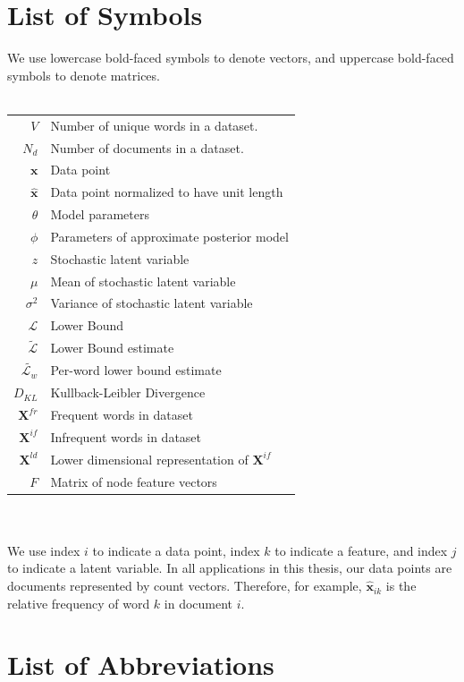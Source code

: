 \documentclass{report}
\begin{document}
\section*{List of Symbols}
We use lowercase bold-faced symbols to denote vectors, and uppercase bold-faced symbols to denote matrices. \\ \\
\begin{tabular}{r l}
	\hspace{15mm} 
	$V$ & Number of unique words in a dataset. \\
	$N_d$ & Number of documents in a dataset. \\
	$\mathbf{x}$ & Data point \\
	$\mathbf{\hat{x}}$ & Data point normalized to have unit length \\	
\
	$\theta$ &  Model parameters \\
	$\phi$ & Parameters of approximate posterior model \\
	$z$ & Stochastic latent variable\\
	$\mu$ & Mean of stochastic latent variable\\
	$\sigma ^2 $ & Variance of stochastic latent variable \\
	$\mathcal{L}$ & Lower Bound \\
	$\tilde{\mathcal{L}}$ & Lower Bound estimate\\
	$\tilde{\mathcal{L}_w}$ & Per-word lower bound estimate \\
	$D_{KL}$ & Kullback-Leibler Divergence \\
	$\mathbf{X}^{fr}$ & Frequent words in dataset \\
	$\mathbf{X}^{if}$ & Infrequent words in dataset \\	
	$\mathbf{X}^{ld}$ & Lower dimensional representation of $\mathbf{X}^{if}$ \\
	$F$ & Matrix of node feature vectors
\end{tabular}
\\ \\
 We use index $i$ to indicate a data point, index $k$ to indicate a feature, and index $j$ to indicate a latent variable. In all applications in this thesis, our data points are documents represented by count vectors. Therefore, for example, $\mathbf{\hat{x}}_{ik}$ is the relative frequency of word $k$ in document $i$.
 \pagebreak
\section*{List of Abbreviations}
\end{document}
